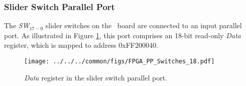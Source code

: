 \subsubsection{Slider Switch Parallel Port}

The {\it SW}$_{17-0}$ slider switches on the \DEBoard~board are connected to an input parallel
port.  As illustrated in Figure \ref{fig:slider_port}, this port 
comprises an 18-bit read-only {\it Data} register, which is mapped to address {\sf 0xFF200040}.

\begin{figure}[h!]
   \begin{center}
       \texttt{[image: ../../../common/figs/FPGA\_PP\_Switches\_18.pdf]}
   \end{center}
   \caption{{\it Data} register in the slider switch parallel port.}
	\label{fig:slider_port}
\end{figure}